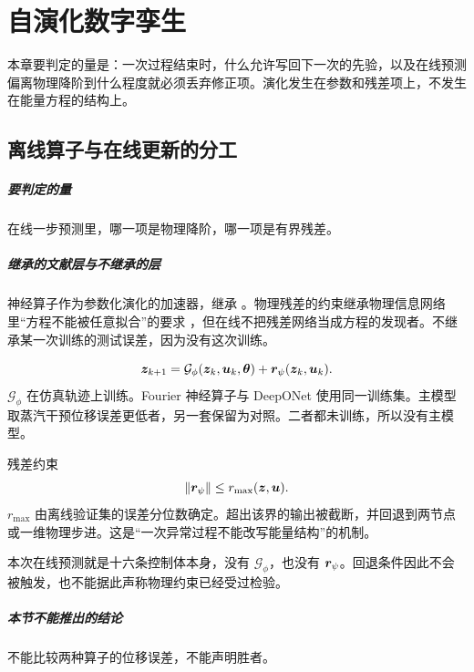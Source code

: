 \chapter{自演化数字孪生}
\label{ch:evolve}

本章要判定的量是：一次过程结束时，什么允许写回下一次的先验，以及在线预测偏离物理降阶到什么程度就必须丢弃修正项。演化发生在参数和残差项上，不发生在能量方程的结构上。

\section{离线算子与在线更新的分工}

\paragraph{要判定的量}
在线一步预测里，哪一项是物理降阶，哪一项是有界残差。

\paragraph{继承的文献层与不继承的层}
神经算子作为参数化演化的加速器，继承 \cite{li2021fno,lu2021deeponet}。物理残差的约束继承物理信息网络里“方程不能被任意拟合”的要求 \cite{raissi2019}，但在线不把残差网络当成方程的发现者。不继承某一次训练的测试误差，因为没有这次训练。

\begin{equation}
\label{eq:op}
\bm{z}_{k+1}=\mathcal{G}_{\phi}(\bm{z}_k,\bm{u}_k,\bm{\theta})+\bm{r}_{\psi}(\bm{z}_k,\bm{u}_k).
\end{equation}
\(\mathcal{G}_{\phi}\) 在仿真轨迹上训练。Fourier 神经算子与 DeepONet 使用同一训练集。主模型取蒸汽干预位移误差更低者，另一套保留为对照。二者都未训练，所以没有主模型。

残差约束
\begin{equation}
\label{eq:bnp}
\|\bm{r}_{\psi}\|\le r_{\max}(\bm{z},\bm{u}).
\end{equation}
\(r_{\max}\) 由离线验证集的误差分位数确定。超出该界的输出被截断，并回退到两节点或一维物理步进。这是“一次异常过程不能改写能量结构”的机制。

本次在线预测就是十六条控制体本身，没有 \(\mathcal{G}_{\phi}\)，也没有 \(\bm{r}_{\psi}\)。回退条件因此不会被触发，也不能据此声称物理约束已经受过检验。

\paragraph{本节不能推出的结论}
不能比较两种算子的位移误差，不能声明胜者。

